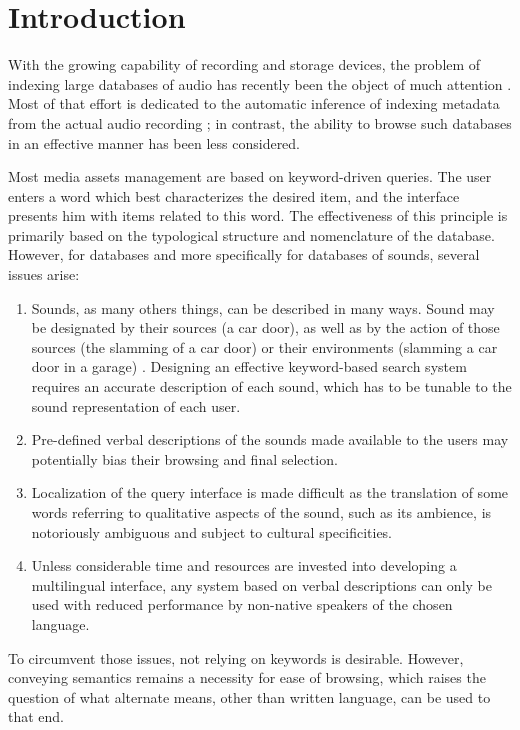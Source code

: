 \documentclass{aes2e}
\begin{document}



\section{Introduction}

With the growing capability of recording and storage devices, the problem of indexing large databases of audio has recently been the object of much attention \cite{Wold1996}. Most of that effort is dedicated to the automatic inference of indexing metadata from the actual audio recording \cite{Zhang1999, tzanetakis2002musical}; in contrast, the ability to browse such databases in an effective manner has been less considered.

Most media assets management are based on keyword-driven queries. The user enters a word which best characterizes the desired item, and the interface presents him with items related to this word. The effectiveness of this principle is primarily based on the typological structure and nomenclature of the database. However, for databases and more specifically for databases of sounds, several issues arise:

\begin{enumerate}
\item Sounds, as many others things, can be described in many ways. Sound may be designated by their
sources (a car door), as well as by the action of those sources (the slamming of a car door) or their environments (slamming a car door in a garage) \cite{houix2012lexical, niessen2010categories, brown2011towards}. Designing an effective keyword-based search system requires an accurate description of each sound, which has to be tunable to the sound representation of each user.
\item Pre-defined verbal descriptions of the sounds made available to the users may potentially bias their browsing and final selection.
\item Localization of the query interface is made difficult as the translation of some words referring to qualitative aspects of the sound, such as its ambience, is notoriously ambiguous and subject to cultural specificities.
\item Unless considerable time and resources are invested into developing a multilingual interface, any system based on verbal descriptions can only be used with reduced performance by non-native speakers of the chosen language.
\end{enumerate}
To circumvent those issues, not relying on keywords is desirable. However, conveying semantics remains a necessity for ease of browsing, which raises the question of what alternate means, other than written language, can be used to that end.
\end{document}

